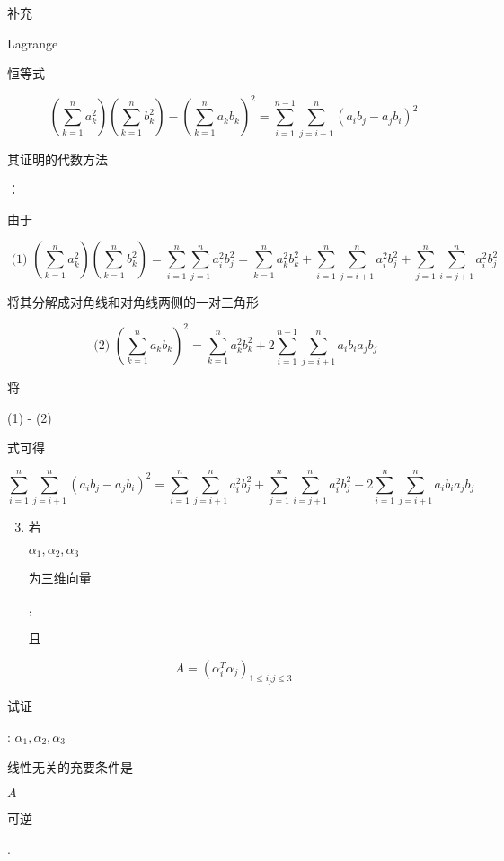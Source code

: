\documentclass[10pt]{article}
\begin{document}
\begin{CJK}{UTF8}{mj}补充\end{CJK} Lagrange \begin{CJK}{UTF8}{mj}恒等式\end{CJK}
$$
\left(\sum_{k=1}^{n} a_{k}^{2}\right)\left(\sum_{k=1}^{n} b_{k}^{2}\right)-\left(\sum_{k=1}^{n} a_{k} b_{k}\right)^{2}=\sum_{i=1}^{n-1} \sum_{j=i+1}^{n}\left(a_{i} b_{j}-a_{j} b_{i}\right)^{2}
$$
\begin{CJK}{UTF8}{mj}其证明的代数方法\end{CJK}：\begin{CJK}{UTF8}{mj}由于\end{CJK}
$$
\text { (1) }\left(\sum_{k=1}^{n} a_{k}^{2}\right)\left(\sum_{k=1}^{n} b_{k}^{2}\right)=\sum_{i=1}^{n} \sum_{j=1}^{n} a_{i}^{2} b_{j}^{2}=\sum_{k=1}^{n} a_{k}^{2} b_{k}^{2}+\sum_{i=1}^{n} \sum_{j=i+1}^{n} a_{i}^{2} b_{j}^{2}+\sum_{j=1}^{n} \sum_{i=j+1}^{n} a_{i}^{2} b_{j}^{2}
$$
\begin{CJK}{UTF8}{mj}将其分解成对角线和对角线两侧的一对三角形\end{CJK}
$$
\text { (2) }\left(\sum_{k=1}^{n} a_{k} b_{k}\right)^{2}=\sum_{k=1}^{n} a_{k}^{2} b_{k}^{2}+2 \sum_{i=1}^{n-1} \sum_{j=i+1}^{n} a_{i} b_{i} a_{j} b_{j}
$$
\begin{CJK}{UTF8}{mj}将\end{CJK} (1) - (2) \begin{CJK}{UTF8}{mj}式可得\end{CJK}
$$
\sum_{i=1}^{n} \sum_{j=i+1}^{n}\left(a_{i} b_{j}-a_{j} b_{i}\right)^{2}=\sum_{i=1}^{n} \sum_{j=i+1}^{n} a_{i}^{2} b_{j}^{2}+\sum_{j=1}^{n} \sum_{i=j+1}^{n} a_{i}^{2} b_{j}^{2}-2 \sum_{i=1}^{n} \sum_{j=i+1}^{n} a_{i} b_{i} a_{j} b_{j}
$$

\begin{enumerate}
  \setcounter{enumi}{2}
  \item \begin{CJK}{UTF8}{mj}若\end{CJK} $\alpha_{1}, \alpha_{2}, \alpha_{3}$ \begin{CJK}{UTF8}{mj}为三维向量\end{CJK}, \begin{CJK}{UTF8}{mj}且\end{CJK}
\end{enumerate}
$$
A=\left(\alpha_{i}^{T} \alpha_{j}\right)_{1 \leqslant i_{j} j \leqslant 3}
$$
\begin{CJK}{UTF8}{mj}试证\end{CJK}: $\alpha_{1}, \alpha_{2}, \alpha_{3}$ \begin{CJK}{UTF8}{mj}线性无关的充要条件是\end{CJK} $A$ \begin{CJK}{UTF8}{mj}可逆\end{CJK}.
\end{document}
